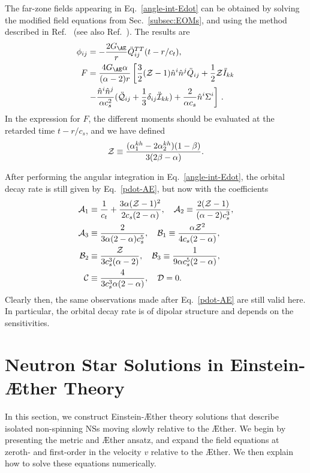 \documentclass[prd,aps,twocolumn,nofootinbib,showpacs,superscriptaddress]{revtex4-1}
\newcommand\be{\begin{equation}}
\newcommand\ee{\end{equation}}
\newcommand{\nn}{\nonumber}
\begin{document}
The far-zone fields appearing in Eq.~\eqref{angle-int-Edot}
can be obtained by solving the modified field equations  from Sec.~\ref{subsec:EOMs}, 
and using the method described in Ref.~\cite{Blas:2011zd} (see also Ref.~\cite{Foster:2007gr}). The 
results are
\begin{align}
\phi_{ij}&=-\frac{2 G_{\AE}}{r} \ddot Q_{ij}^{TT}(t-r/c_t), \nn \\
\label{psikh}
F&= \frac{4G_{\AE}\alpha}{ (\alpha-2) 
  r}\left[\frac{3}{2}({\cal Z}-1) \hat n^i \hat n^j \ddot
Q_{ij}+\frac{1}{2} {\cal Z} \ddot I_{kk} \right.  \nn \\ &\left.  -\frac{\hat n^i\hat n^j}{\alpha c_s^2}(\ddot{\cal Q}_{ij}+\frac{1}{3}
\delta_{ij}\ddot{\cal I}_{kk})+\frac{2}{\alpha c_s} \hat n^i
\Sigma^i\right]\,.
\end{align}
%
In the expression for $F$, the different moments should be evaluated
at the retarded time $t-r/c_s$, and we have defined
\be
{\cal Z}\equiv \frac{(\alpha_1^{kh}-2\alpha_2^{kh})(1-\beta)}{3(2\beta-\alpha)}.
\ee

After performing the angular integration in Eq.~\eqref{angle-int-Edot}, the orbital decay rate is still
given by Eq.~\eqref{pdot-AE},  but now with the coefficients 
\begin{align}
\label{A1-def-HL}
{\cal A}_1 &\equiv \frac{1}{c_t}+\frac{3 \alpha({\cal Z}-1)^2}{2 c_s(2-\alpha)},
\quad {\cal A}_2\equiv \frac{2({\cal Z}-1)}{(\alpha-2)c_s^3}, 
\\ 
\label{A3-def-HL}
{\cal A}_3 &\equiv \frac{2}{3\alpha(2-\alpha)c_s^5}, \quad {\cal B}_1\equiv
\frac{\alpha{\cal Z}^2}{4 c_s(2-\alpha)}, 
\\ 
{\cal B}_2 &\equiv \frac{{\cal Z}}{3 c_s^3(\alpha-2)},\quad  {\cal B}_3\equiv \frac{1}{9\alpha
  c_s^5(2-\alpha)},
\\ 
{\cal C} &\equiv \frac{4}{3 c_s^3\alpha(2-\alpha)}, \quad {\cal D}=0.
\end{align}
Clearly then, the same observations made after 
Eq.~\eqref{pdot-AE} are still valid here. In particular, the orbital decay rate is of dipolar structure and depends on the sensitivities. 

\section{Neutron Star Solutions in Einstein-\AE ther Theory}
\label{sec:NS-Sols}

In this section, we construct Einstein-\AE ther
theory solutions that  describe isolated non-spinning NSs moving slowly relative to the \AE ther.
We begin by presenting the metric and \AE ther ansatz, and expand the field
equations at zeroth- and first-order in the velocity $v$ relative to the \AE ther. We then
explain how to solve these equations numerically.
\end{document}

